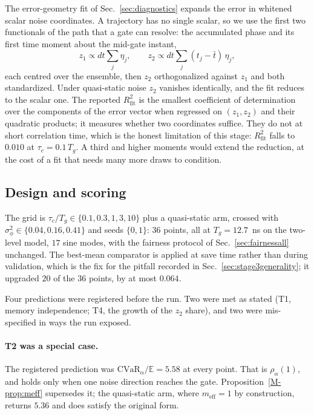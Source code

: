 \documentclass[aps,pra,onecolumn,notitlepage,superscriptaddress,nofootinbib,floatfix]{revtex4-2}
\newcommand{\cvar}{\mathrm{CVaR}}
\newcommand{\E}{\mathbb{E}}
\begin{document}
The error-geometry fit of Sec.~\ref{sec:diagnostics} expands the error in whitened
scalar noise coordinates. A trajectory has no single scalar, so we use the
first two functionals of the path that a gate can resolve: the accumulated
phase and its first time moment about the mid-gate instant,
\begin{equation}
z_1\propto dt\sum_j\eta_j,\qquad
z_2\propto dt\sum_j(t_j-\bar t)\,\eta_j ,
\end{equation}
each centred over the ensemble, then $z_2$ orthogonalized against $z_1$ and
both standardized. Under quasi-static noise $z_2$ vanishes identically, and
the fit reduces to the scalar one. The reported $R^2_{\mathrm{fit}}$ is the
smallest coefficient of determination over the components of the error vector
when regressed on $(z_1,z_2)$ and their quadratic products; it measures
whether two coordinates suffice. They do not at short correlation time, which
is the honest limitation of this stage: $R^2_{\mathrm{fit}}$ falls to $0.010$
at $\tau_c=0.1\,T_g$. A third and higher moments would extend the reduction,
at the cost of a fit that needs many more draws to condition.

\subsection{Design and scoring}

The grid is $\tau_c/T_g\in\{0.1,0.3,1,3,10\}$ plus a quasi-static arm, crossed
with $\sigma_\phi^2\in\{0.04,0.16,0.41\}$ and seeds $\{0,1\}$: $36$ points,
all at $T_g=12.7$~ns on the two-level model, $17$ sine modes, with the
fairness protocol of Sec.~\ref{sec:fairnessall} unchanged. The best-mean comparator
is applied at save time rather than during validation, which is the fix for
the pitfall recorded in Sec.~\ref{sec:stage3generality}; it upgraded $20$ of the
$36$ points, by at most $0.064$.

Four predictions were registered before the run. Two were met as stated (T1,
memory independence; T4, the growth of the $z_2$ share), and two were
mis-specified in ways the run exposed.

\paragraph*{T2 was a special case.} The registered prediction was
$\cvar_\alpha/\E=5.58$ at every point. That is $\rho_\alpha(1)$, and holds
only when one noise direction reaches the gate. Proposition~\ref{M-prop:meff}
supersedes it; the quasi-static arm, where $m_{\mathrm{eff}}=1$ by
construction, returns $5.36$ and does satisfy the original form.
\end{document}
